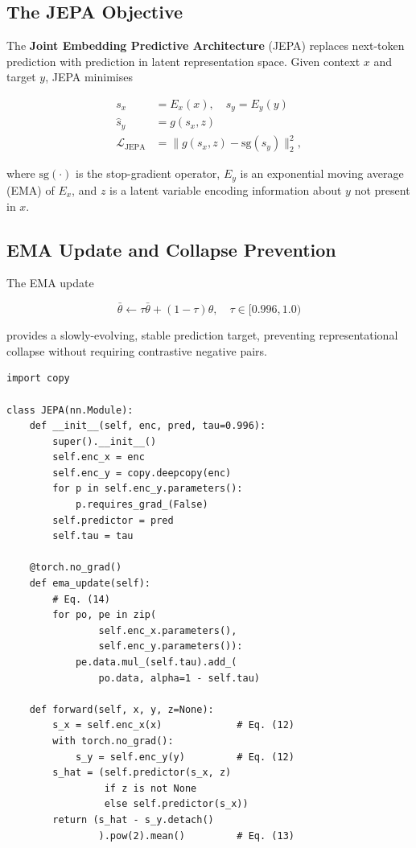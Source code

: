 \documentclass[10pt,twocolumn]{article}
\begin{document}
\subsection{The JEPA Objective}

The \textbf{Joint Embedding Predictive Architecture} (JEPA)
\citep{lecun2022path,assran2023ijepa} replaces next-token prediction
with prediction in latent representation space.  Given context $x$
and target $y$, JEPA minimises

\begin{align}
  s_x &= E_x(x), \quad s_y = E_y(y) \label{eq:jepa_enc}\\
  \hat{s}_y &= g(s_x, z) \label{eq:jepa_pred}\\
  \mathcal{L}_{\text{JEPA}} &= \|g(s_x, z) - \text{sg}(s_y)\|_2^2,
  \label{eq:jepa_loss}
\end{align}

\noindent where $\text{sg}(\cdot)$ is the stop-gradient operator,
$E_y$ is an exponential moving average (EMA) of $E_x$, and $z$ is
a latent variable encoding information about $y$ not present in $x$.

\subsection{EMA Update and Collapse Prevention}

The EMA update

\begin{equation}
  \bar{\theta} \leftarrow \tau \bar{\theta} + (1 - \tau) \theta,
  \quad \tau \in [0.996, 1.0)
  \label{eq:ema}
\end{equation}

\noindent provides a slowly-evolving, stable prediction target, preventing
representational collapse without requiring contrastive negative pairs.

\begin{lstlisting}[caption={JEPA with EMA target encoder.}]
import copy

class JEPA(nn.Module):
    def __init__(self, enc, pred, tau=0.996):
        super().__init__()
        self.enc_x = enc
        self.enc_y = copy.deepcopy(enc)
        for p in self.enc_y.parameters():
            p.requires_grad_(False)
        self.predictor = pred
        self.tau = tau

    @torch.no_grad()
    def ema_update(self):
        # Eq. (14)
        for po, pe in zip(
                self.enc_x.parameters(),
                self.enc_y.parameters()):
            pe.data.mul_(self.tau).add_(
                po.data, alpha=1 - self.tau)

    def forward(self, x, y, z=None):
        s_x = self.enc_x(x)             # Eq. (12)
        with torch.no_grad():
            s_y = self.enc_y(y)         # Eq. (12)
        s_hat = (self.predictor(s_x, z)
                 if z is not None
                 else self.predictor(s_x))
        return (s_hat - s_y.detach()
                ).pow(2).mean()         # Eq. (13)
\end{lstlisting}
\end{document}
